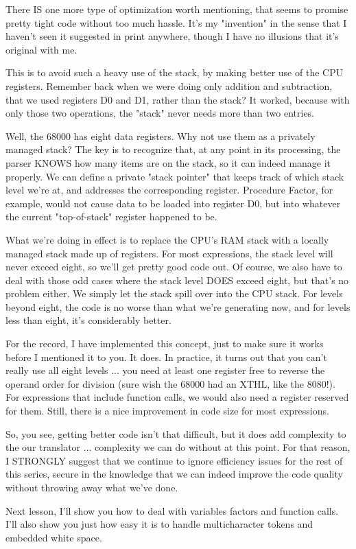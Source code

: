 \documentclass[float=false, crop=false]{standalone}
\begin{document}
There IS one more type of optimization worth mentioning, that seems to promise
pretty tight code without too much hassle. It's my "invention" in the sense that
I haven't seen it suggested in print anywhere, though I have no illusions that
it's original with me.

This is to avoid such a heavy use of the stack, by making better use of the CPU
registers. Remember back when we were doing only addition and subtraction, that
we used registers D0 and D1, rather than the stack? It worked, because with only
those two operations, the "stack" never needs more than two entries.

Well, the 68000 has eight data registers. Why not use them as a privately
managed stack? The key is to recognize that, at any point in its processing, the
parser KNOWS how many items are on the stack, so it can indeed manage it
properly. We can define a private "stack pointer" that keeps track of which
stack level we're at, and addresses the corresponding register. Procedure
Factor, for example, would not cause data to be loaded into register D0, but
into whatever the current "top-of-stack" register happened to be.

What we're doing in effect is to replace the CPU's RAM stack with a locally
managed stack made up of registers. For most expressions, the stack level will
never exceed eight, so we'll get pretty good code out. Of course, we also have
to deal with those odd cases where the stack level DOES exceed eight, but that's
no problem either. We simply let the stack spill over into the CPU stack. For
levels beyond eight, the code is no worse than what we're generating now, and
for levels less than eight, it's considerably better.

For the record, I have implemented this concept, just to make sure it works
before I mentioned it to you. It does. In practice, it turns out that you can't
really use all eight levels ... you need at least one register free to reverse
the operand order for division (sure wish the 68000 had an XTHL, like the
8080!). For expressions that include function calls, we would also need a
register reserved for them. Still, there is a nice improvement in code size for
most expressions.

So, you see, getting better code isn't that difficult, but it does add
complexity to the our translator ... complexity we can do without at this point.
For that reason, I STRONGLY suggest that we continue to ignore efficiency issues
for the rest of this series, secure in the knowledge that we can indeed improve
the code quality without throwing away what we've done.

Next lesson, I'll show you how to deal with variables factors and function
calls. I'll also show you just how easy it is to handle multicharacter tokens
and embedded white space.
\end{document}
